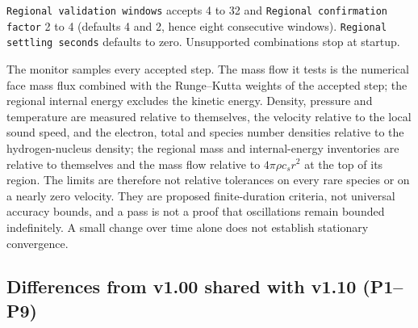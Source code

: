 \documentclass[english,a4paper]{my_memo}
\begin{document}
\texttt{Regional validation windows} accepts 4 to 32 and
\texttt{Regional confirmation factor} 2 to 4 (defaults 4 and 2, hence eight
consecutive windows). \texttt{Regional settling seconds} defaults to zero.
Unsupported combinations stop at startup.

The monitor samples every accepted step. The mass flow it tests is the
numerical face mass flux combined with the Runge--Kutta weights of the
accepted step; the regional internal energy excludes the kinetic energy.
Density, pressure and temperature are measured relative to themselves, the
velocity relative to the local sound speed, and the electron, total and
species number densities relative to the hydrogen-nucleus density; the regional
mass and internal-energy inventories are relative to themselves and the mass
flow relative to $4\pi\rho c_s r^2$ at the top of its region. The limits are
therefore not relative tolerances on every rare species or on a nearly zero
velocity. They are proposed finite-duration criteria, not universal accuracy
bounds, and a pass is not a proof that oscillations remain bounded
indefinitely. A small change over time alone does not establish stationary
convergence.

\subsection{Differences from v1.00 shared with v1.10 (P1--P9)}\label{sec:v110-changes}
\end{document}
